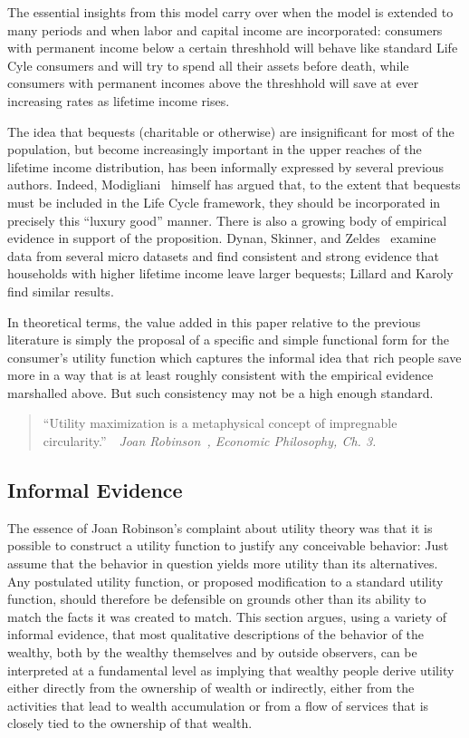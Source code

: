 \documentclass[titlepage,12pt]{article}
\begin{document}
The essential insights from this model carry over when the model is 
extended to many periods and when labor and capital income are 
incorporated: consumers with permanent income below a certain 
threshhold will behave like standard Life Cyle consumers and will try 
to spend all their assets before death, while consumers with permanent 
incomes above the threshhold will save at ever increasing rates as 
lifetime income rises.

The idea that bequests (charitable or otherwise) are insignificant for 
most of the population, but become increasingly important in the upper 
reaches of the lifetime income distribution, has been informally 
expressed by several previous authors.  Indeed, 
Modigliani~\citeyear{modigliani:nobel} himself has argued that, to the 
extent that bequests must be included in the Life Cycle framework, 
they should be incorporated in precisely this ``luxury good'' manner.  
There is also a growing body of empirical evidence in support 
of the proposition.  Dynan, Skinner, and Zeldes~\citeyear{dsz:richsave} 
examine data from several micro datasets and find consistent and 
strong evidence that households with higher lifetime income leave 
larger bequests; Lillard and Karoly~\citeyear{lillard&karoly:richsave} 
find similar results.

In theoretical terms, the value added in this paper relative to the 
previous literature is simply the proposal of a specific and simple 
functional form for the consumer's utility function which captures the 
informal idea that rich people save more in a way that is at least 
roughly consistent with the empirical evidence marshalled above.  But 
such consistency may not be a high enough standard.

\begin{quote}
``Utility maximization is a metaphysical concept of impregnable 
circularity.''~~\emph{Joan Robinson~\citeyear{robinson:philosophy}, Economic 
Philosophy, Ch. 3.}
\end{quote}

\hypertarget{informal-evidence}{}
\subsection{Informal Evidence}
\label{subsec:InformalEv}
The essence of Joan Robinson's complaint about utility theory was that 
it is possible to construct a utility function to justify any 
conceivable behavior: Just assume that the behavior in question yields 
more utility than its alternatives.  Any postulated utility function, 
or proposed modification to a standard utility function, should 
therefore be defensible on grounds other than its ability to match the 
facts it was created to match.  This section argues, using a variety 
of informal evidence, that most qualitative descriptions of the 
behavior of the wealthy, both by the wealthy themselves and by outside 
observers, can be interpreted at a fundamental level as implying that 
wealthy people derive utility either directly from the ownership of 
wealth or indirectly, either from the activities that lead to wealth 
accumulation or from a flow of services that is closely tied to the 
ownership of that wealth.
\end{document}
